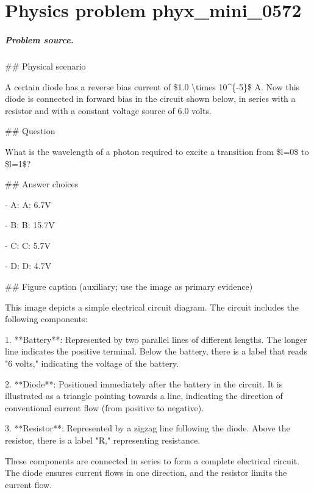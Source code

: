 
\chapter{Physics problem phyx\_mini\_0572}
\label{ch:PhyXMiniProblems_problem_phyx_mini_0572}

\paragraph{Problem source.}
\#\# Physical scenario

A certain diode has a reverse bias current of \$1.0 \textbackslash{}times 10\textasciicircum{}\{-5\}\$ A. Now this diode is connected in forward bias in the circuit shown below, in series with a resistor and with a constant voltage source of 6.0 volts.

\#\# Question

What is the wavelength of a photon required to excite a transition from \$l=0\$ to \$l=1\$?

\#\# Answer choices

- A: A: 6.7V

- B: B: 15.7V

- C: C: 5.7V

- D: D: 4.7V

\#\# Figure caption (auxiliary; use the image as primary evidence)

This image depicts a simple electrical circuit diagram. The circuit includes the following components:

1. **Battery**: Represented by two parallel lines of different lengths. The longer line indicates the positive terminal. Below the battery, there is a label that reads "6 volts," indicating the voltage of the battery.

2. **Diode**: Positioned immediately after the battery in the circuit. It is illustrated as a triangle pointing towards a line, indicating the direction of conventional current flow (from positive to negative).

3. **Resistor**: Represented by a zigzag line following the diode. Above the resistor, there is a label "R," representing resistance.

These components are connected in series to form a complete electrical circuit. The diode ensures current flows in one direction, and the resistor limits the current flow.

